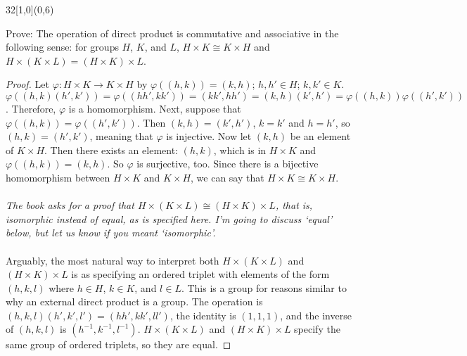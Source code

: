 \documentclass[12pt]{article}
\newenvironment{exercise}[2]{\begin{textblock}{32}[1,0](0,#2)\noindent#1\end{textblock}}{\vspace{1in}}
\begin{document}
\begin{exercise}{2.74}{6}
	{\noindent}Prove: The operation of direct product is commutative and associative in the following sense: for groups $H$, $K$, and $L$, $H\times K\cong K\times H$ and $H\times(K\times L)=(H\times K)\times L$.

  \begin{proof}
    Let $\varphi:H\times K\to K\times H$ by $\varphi((h,k)) = (k,h)$; $h,h'\in H$; $k,k'\in K$.
    $\varphi((h,k)(h',k')) = \varphi((hh',kk')) = (kk',hh') = (k,h)(k',h') = \varphi((h,k))\varphi((h',k'))$. Therefore, $\varphi$ is a homomorphism.
    Next, suppose that $\varphi((h,k))=\varphi((h',k'))$. Then $(k,h)=(k',h')$, $k=k'$ and $h=h'$, so $(h,k)=(h',k')$, meaning that $\varphi$ is injective.
    Now let $(k,h)$ be an element of $K\times H$. Then there exists an element: $(h,k)$, which is in $H\times K$ and $\varphi((h,k))=(k,h)$. So $\varphi$ is surjective, too.
    Since there is a bijective homomorphism between $H\times K$ and $K\times H$, we can say that $H\times K\cong K\times H$.\\
    \\
    \textit{The book asks for a proof that $H\times(K\times L)\cong(H\times K)\times L$, that is, isomorphic instead of equal, as is specified here. I'm going to discuss `equal' below, but let us know if you meant `isomorphic'.}\\
    \\
    Arguably, the most natural way to interpret both $H\times(K\times L)$ and $(H\times K)\times L$ is as specifying an
    ordered triplet with elements of the form $(h,k,l)$ where $h\in H$, $k\in K$, and $l\in L$. This is a group for reasons
    similar to why an external direct product is a group. The operation is $(h,k,l)(h',k',l')=(hh',kk',ll')$, the identity is
    $(1,1,1)$, and the inverse of $(h,k,l)$ is $(h^{-1},k^{-1},l^{-1})$. $H\times(K\times L)$ and $(H\times K)\times L$ specify
    the same group of ordered triplets, so they are equal.
  \end{proof}
\end{exercise}
\end{document}
